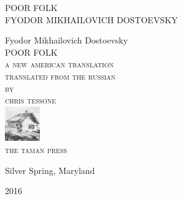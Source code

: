 \newlength{\drop}\setlength{\drop}{0.12\textheight}

\newcommand*{\firsttitle}{\begingroup
\centering
\vspace*{3em}
{\Large POOR FOLK}\\[\baselineskip]
{\Large FYODOR MIKHAILOVICH DOSTOEVSKY}
\vfill\null
\endgroup}

\newcommand*{\titleAM}{\begingroup
\centering
\vspace*{\drop}
{\large Fyodor Mikhailovich Dostoevsky}\\[\baselineskip]
{\Huge POOR FOLK}\\[\baselineskip]
{\scshape a new american translation}\\ [\baselineskip]
{\scshape translated from the russian}\\
{\scshape by}\\
{\scshape chris tessone}\\
\vfill%
{\scshape \includegraphics[width=1.5cm, height=1.5cm]{taman-press.png}}\\[0.5\baselineskip]
{\small\scshape the taman press}\par
{\small Silver Spring, Maryland}\par
{\small\scshape 2016}\par
\endgroup}

\firsttitle
\thispagestyle{empty}
\clearpage

\newpage\null\thispagestyle{empty}\newpage

\titleAM
\thispagestyle{empty}
\clearpage 
